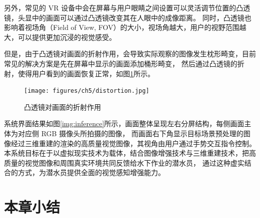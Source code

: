 另外，常见的 VR 设备中会在屏幕与用户眼睛之间设置可以灵活调节位置的凸透镜，头显中的画面可以通过凸透镜改变其在人眼中的成像距离。
同时，凸透镜也影响着视场角（Field of View, FOV）的大小，视场角越大，用户的视野范围越大，可以提供更加沉浸的视觉感受。

但是，由于凸透镜对画面的折射作用，会导致实际观察的图像发生枕形畸变，目前常见的解决方案是先在屏幕中显示的画面添加桶形畸变，
然后通过凸透镜的折射，使得用户看到的画面恢复正常，如图\ref{img:distortion}所示。
\begin{figure}[ht]
    \centering
    \texttt{[image: figures/ch5/distortion.jpg]}
    \caption{凸透镜对画面的折射作用}
    \label{img:distortion}
\end{figure}

系统界面结果如图\ref{img:inference}所示，画面整体呈现左右分屏结构，每侧画面主体为对应侧 RGB 摄像头所拍摄的图像，
而画面右下角显示目标场景预处理的图像经过三维重建的渲染的高质量视觉图像，其视角由用户通过手势交互指令控制。
本系统目标在于以虚拟现实技术为载体，结合图像增强技术与三维重建技术，把高质量的视觉图像和周围真实环境共同反馈给水下作业的潜水员，
通过这种虚实结合的方式，为潜水员提供全面的视觉感知增强能力。

\section{本章小结}














